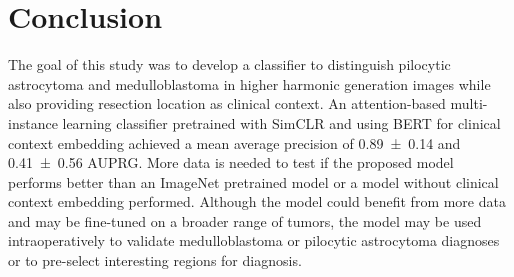 \section{Conclusion}
The goal of this study was to develop a classifier to distinguish pilocytic astrocytoma and medulloblastoma in higher harmonic generation images while also providing resection location as clinical context.
An attention-based multi-instance learning classifier pretrained with SimCLR and using BERT for clinical context embedding achieved a mean average precision of \num{0.89\pm 0.14} and \num{0.41\pm 0.56} AUPRG.
More data is needed to test if the proposed model performs better than an ImageNet pretrained model or a model without clinical context embedding performed.
Although the model could benefit from more data and may be fine-tuned on a broader range of tumors, the model may be used intraoperatively to validate medulloblastoma or pilocytic astrocytoma diagnoses or to pre-select interesting regions for diagnosis.

